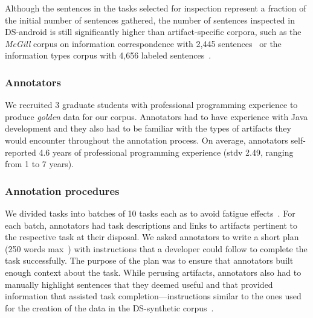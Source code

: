 Although the sentences in the tasks selected for inspection represent
a fraction of the initial number of sentences gathered, 
the number of sentences inspected in \acs{DS-android}
is still significantly higher than 
artifact-specific corpora, such as the \textit{McGill} corpus on information correspondence with 2,445 sentences~\cite{arya2020} or the information types corpus with 4,656 labeled sentences~\cite{Arya2019}.






\subsubsection{Annotators}


We recruited 3 graduate students with professional programming experience to produce \textit{golden} data for our corpus. Annotators had to have experience with Java development and they also had to be familiar with the types of artifacts they would encounter throughout the annotation process. 
On average, annotators self-reported 4.6 years of professional
programming experience (stdv 2.49, ranging from 1 to 7 years).



\subsubsection{Annotation procedures}



We divided tasks into batches of 10 tasks each as to avoid fatigue effects~\cite{Ponzanelli2017}. For each batch, annotators had task descriptions and links to artifacts pertinent to the respective task at their disposal. We asked annotators to write a short plan (250 words max~\cite{Rastkar2010}) with instructions that a developer could follow to complete the task successfully. 
The purpose of the plan was to ensure that annotators built enough context about the task.
While perusing artifacts, annotators also had to manually highlight sentences that they deemed useful and that provided information that assisted task completion---instructions similar to the ones used for the creation of the data in the \acs{DS-synthetic} corpus~\cite{marques2020}.


